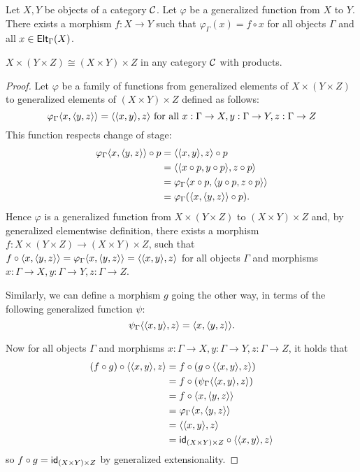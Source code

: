 \begin{proposition}
  \label{prop:generalized-elementwise-definition}
  Let \(X,Y\) be objects of a category \(\mathcal C\).
  Let \(\varphi\) be a generalized function from \(X\) to \(Y\).
  There exists a morphism \(f : X \to Y\)
  such that \(\varphi_\Gamma(x) = f \circ x\)
  for all objects \(\Gamma\) and all \(x \in \mathsf{Elt}_{\Gamma}(X)\).
\end{proposition}

\begin{proposition}
  \(X \times (Y\times Z) \cong (X \times Y) \times Z\)
  in any category \(\mathcal C\) with products.
\end{proposition}
\begin{proof}
  Let \(\varphi\) be a family of functions
  from generalized elements of \(X \times (Y\times Z)\)
  to generalized elements of \((X\times Y) \times Z\)
  defined as follows:
  \[
  \varphi_\Gamma\langle x,\langle y,z\rangle\rangle
  =\langle \langle x,y\rangle,z\rangle
  \text{ for all \(x:\Gamma\to X,y:\Gamma\to Y,z:\Gamma\to Z\)}
  \]
  This function respects change of stage:
  \begin{align}
    \varphi_\Gamma\langle x,\langle y,z\rangle\rangle\circ p
    &= \langle \langle x,y\rangle,z\rangle\circ p\\
    &= \langle \langle x\circ p,y\circ p\rangle,z \circ p\rangle\\
    &= \varphi_\Gamma\langle x\circ p,\langle y\circ p,z\circ p\rangle\rangle\\
    &= \varphi_\Gamma(\langle x,\langle y,z\rangle\rangle\circ p).
  \end{align}
  Hence \(\varphi\) is a generalized function from \(X \times (Y\times Z)\)
  to \((X\times Y) \times Z\) and,
  by generalized elementwise definition,
  there exists a morphism \(f : X \times (Y\times Z) \to (X\times Y) \times Z\),
  such that \(f\circ \langle x,\langle y,z\rangle\rangle
  = \varphi_\Gamma\langle x,\langle y,z\rangle\rangle
  = \langle \langle x,y\rangle,z\rangle\)
  for all objects \(\Gamma\) and morphisms \(x:\Gamma\to X,y:\Gamma\to Y,z:\Gamma\to Z\).

  Similarly, we can define a morphism \(g\) going the other way,
  in terms of the following generalized function \(\psi\):
  \[
  \psi_\Gamma\langle \langle x,y\rangle,z\rangle = \langle x,\langle y,z\rangle\rangle.
  \]

  Now for
  all objects \(\Gamma\) and morphisms \(x:\Gamma\to X,y:\Gamma\to Y,z:\Gamma\to Z\),
  it holds that
  \begin{align}
    (f\circ g)\circ \langle \langle x,y\rangle,z\rangle
    &= f\circ (g\circ \langle \langle x,y\rangle,z\rangle) \\
    &= f\circ (\psi_\Gamma\langle \langle x,y\rangle,z\rangle) \\
    &= f\circ \langle x,\langle y,z\rangle\rangle \\
    &= \varphi_\Gamma\langle x,\langle y,z\rangle\rangle \\
    &= \langle \langle x,y\rangle,z\rangle \\
    &= \mathsf{id}_{(X\times Y) \times Z} \circ \langle \langle x,y\rangle,z\rangle
  \end{align}
  so \(f\circ g = \mathsf{id}_{(X\times Y) \times Z}\)
  by generalized extensionality.


\end{proof}
